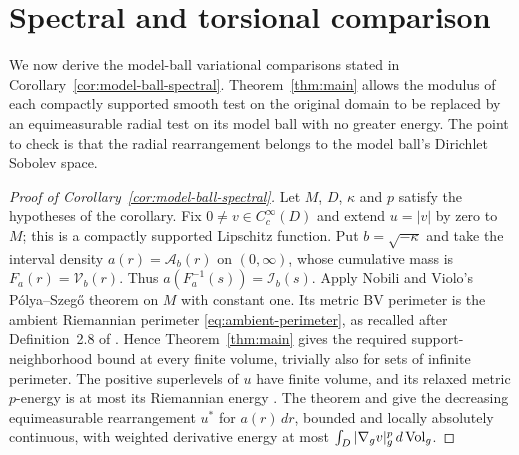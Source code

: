 \section{Spectral and torsional comparison}\label{sec:consequences}

We now derive the model-ball variational comparisons stated in
Corollary~\ref{cor:model-ball-spectral}. Theorem~\ref{thm:main}
allows the modulus of each compactly supported smooth test on the
original domain to be replaced by an equimeasurable radial test on its
model ball with no greater energy.
The point to check is that the radial rearrangement belongs to the
model ball's Dirichlet Sobolev space.

\begin{proof}[Proof of Corollary~\ref{cor:model-ball-spectral}]
Let $M$, $D$, $\kappa$ and $p$ satisfy the hypotheses of the corollary.
Fix $0\ne v\in C_c^\infty(D)$ and extend $u=|v|$ by zero to $M$;
this is a compactly supported Lipschitz function.
Put $b=\sqrt{-\kappa}$ and take the interval density
$a(r)=\mathcal A_b(r)$ on $(0,\infty)$, whose cumulative mass is
$F_a(r)=\mathcal V_b(r)$. Thus $a(F_a^{-1}(s))=\mathcal I_b(s)$.
Apply Nobili and Violo's P\'olya--Szeg\H{o} theorem
\cite[Theorem~1.1]{NobiliViolo2025} on $M$ with constant one.
Its metric BV perimeter is the ambient Riemannian perimeter
\eqref{eq:ambient-perimeter}, as recalled after Definition~2.8 of
\cite{AntonelliBrueFogagnoloPozzetta2022}. Hence Theorem~\ref{thm:main}
gives the required support-neighborhood bound at every finite volume,
trivially also for sets of infinite perimeter. The positive superlevels
of $u$ have finite volume, and its relaxed metric $p$-energy is at most its Riemannian
energy \cite[Definition~2.1]{NobiliViolo2025}. The theorem and
\cite[Lemma~3.1]{NobiliViolo2025} give the decreasing equimeasurable
rearrangement $u^*$ for $a(r)\,dr$, bounded and locally absolutely
continuous, with weighted derivative energy at most
$\int_D|\nabla_gv|_g^p\,d\operatorname{Vol}_g$.


\end{proof}
